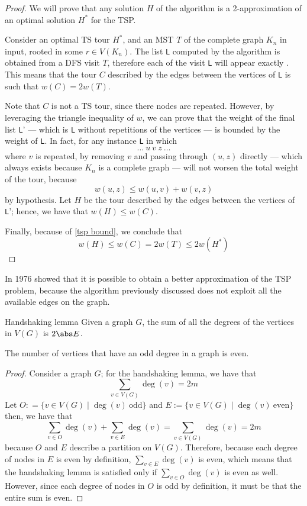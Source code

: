 \documentclass[a4paper, 12pt]{report}
\begin{document}
    \begin{proof}
        We will prove that any solution $H$ of the algorithm is a 2-approximation of an optimal solution $H^*$ for the TSP.

        Consider an optimal TS tour $H^*$, and an MST $T$ of the complete graph $K_n$ in input, rooted in some $r \in V(K_n)$. The list \texttt L computed by the algorithm is obtained from a  DFS visit $T$, therefore each  of the visit \texttt L will appear exactly . This means that the tour $C$ described by the edges between the vertices of \texttt L is such that $w(C) = 2 w(T)$.

        Note that $C$ is not a TS tour, since there nodes are repeated. However, by leveraging the triangle inequality of $w$, we can prove that the weight of the final list \texttt L' --- which is \texttt L without repetitions of the vertices --- is bounded by the weight of \texttt L. In fact, for any instance \texttt L in which $$\ldots \ u \ v \ z \ \ldots$$ where $v$ is repeated, by removing $v$ and passing through $(u, z)$ directly --- which always exists because $K_n$ is a complete graph --- will not worsen the total weight of the tour, because $$w(u, z) \le w(u, v) + w(v, z)$$ by hypothesis. Let $H$ be the tour described by the edges between the vertices of \texttt L'; hence, we have that $w(H) \le w(C)$.

        Finally, because of \cref{tsp bound}, we conclude that $$w(H) \le w(C) = 2w(T) \le 2w(H^*)$$
    \end{proof}

    In 1976 \textcite{christofides} showed that it is possible to obtain a better approximation of the TSP problem, because the algorithm previously discussed does not exploit all the available edges on the graph.

    \begin{framedlem}[label={handshaking lemma}]{Handshaking lemma}
        Given a graph $G$, the sum of all the degrees of the vertices in $V(G)$ is $2 \abs E$.
    \end{framedlem}

    \begin{framedcor}[label={odd even}]{}
        The number of vertices that have an odd degree in a graph is even.
    \end{framedcor}

    \begin{proof}
        Consider a graph $G$; for the handshaking lemma, we have that $$\sum_{v \in V(G)}{\deg(v)} = 2 m$$ Let $O: = \{v \in V(G) \mid \deg(v) \ \mathrm{odd}\}$ and $E := \{v \in V(G) \mid \deg(v) \ \mathrm{even}\}$ then, we have that $$\sum_{v \in O}{\deg(v)} + \sum_{v \in E}{\deg(v)} = \sum_{v \in V(G)} {\deg(v)} = 2m$$ because $O$ and $E$ describe a partition on $V(G)$. Therefore, because each degree of nodes in $E$ is even by definition, $\sum_{v \in E}{\deg(v)}$ is even, which means that the handshaking lemma is satisfied only if $\sum_{v \in O}{\deg(v)}$ is even as well. However, since each degree of nodes in $O$ is odd by definition, it must be that the entire sum is even.
    \end{proof}
\end{document}
